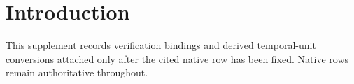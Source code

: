 \section{Introduction}
This supplement records verification bindings and derived temporal-unit conversions attached only after the cited native row has been fixed. Native rows remain authoritative throughout.
